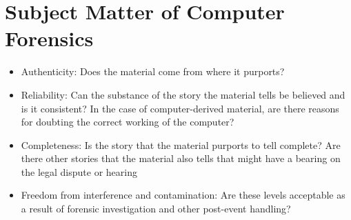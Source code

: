 \documentclass{scrreprt}
\begin{document}
\section{Subject Matter of Computer Forensics}
\begin{itemize}
\item Authenticity: Does the material come from where it purports?
\item Reliability: Can the substance of the story the material tells be believed and is
it consistent? In the case of computer-derived material, are there reasons for
doubting the correct working of the computer?
\item Completeness: Is the story that the material purports to tell complete? Are
there other stories that the material also tells that might have a bearing on the
legal dispute or hearing
\item Freedom from interference and contamination: Are these levels acceptable as
a result of forensic investigation and other post-event handling?

\end{itemize}
\end{document}
